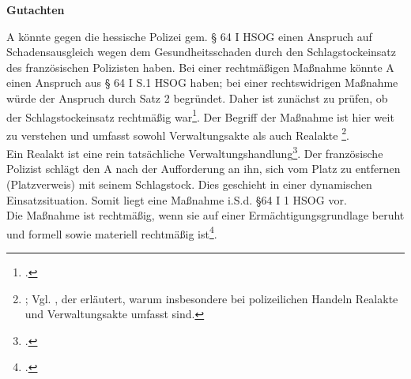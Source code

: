 \documentclass[widefront, ngerman]{jura}
\begin{document}
\tableofcontents

\printbibliography[maxnames=10]


\mainmatter
\boldmath

\begin{center}
\large\bfseries Gutachten
\normalsize \mdseries
\end{center}

A könnte gegen die hessische Polizei gem. § 64 I HSOG einen Anspruch auf Schadensausgleich wegen dem Gesundheitsschaden durch den Schlagstockeinsatz des französischen Polizisten haben. Bei einer rechtmäßigen Maßnahme könnte A einen Anspruch aus § 64 I S.1 HSOG haben; bei einer rechtswidrigen Maßnahme würde der Anspruch durch Satz 2 begründet. Daher ist zunächst zu prüfen, ob der Schlagstockeinsatz rechtmäßig war\footcite[\S §27 Rn. 33]{PierothSchlinkPolizei}.
Der Begriff der Maßnahme ist hier weit zu verstehen und umfasst sowohl Verwaltungsakte als auch Realakte
\footnote{\cite[Rn. 315]{MuehlLeggereitHausmann}; Vgl.
\cite[(250)]
{RumpfNVwZ1992}, der erläutert, warum insbesondere bei polizeilichen Handeln Realakte und Verwaltungsakte umfasst sind.
}.\\
Ein Realakt ist eine rein tatsächliche Verwaltungshandlung\footcite[Rn 450]{detterbeckVerwR}. Der französische Polizist schlägt den A nach der Aufforderung an ihn, sich vom Platz zu entfernen (Platzverweis) mit seinem Schlagstock. Dies geschieht in einer dynamischen Einsatzsituation. Somit liegt eine Maßnahme i.S.d. §64 I 1 HSOG vor.\\
Die Maßnahme ist rechtmäßig, wenn sie auf einer Ermächtigungsgrundlage beruht und formell sowie materiell rechtmäßig ist\footcite[\S 27 Rn. 31f.]{PierothSchlinkPolizei}.
\end{document}
